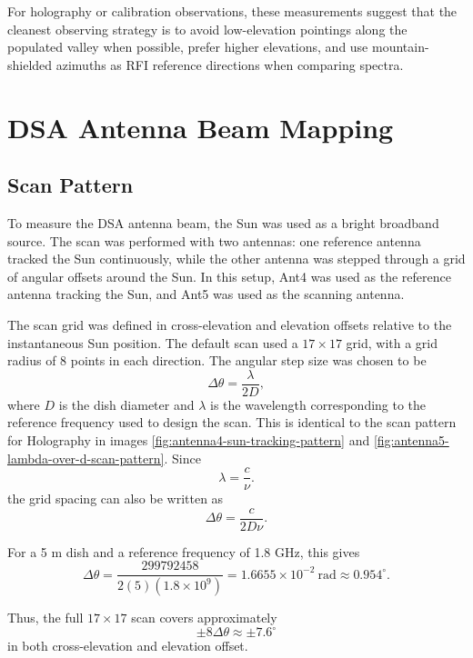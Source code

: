 \documentclass[12pt]{extarticle}
\begin{document}
For holography or calibration observations, these measurements suggest that the cleanest observing strategy is to avoid low-elevation pointings along the populated valley when possible, prefer higher elevations, and use mountain-shielded azimuths as RFI reference directions when comparing spectra.
\section{DSA Antenna Beam Mapping}

\subsection{Scan Pattern}

To measure the DSA antenna beam, the Sun was used as a bright broadband source.
The scan was performed with two antennas: one reference antenna tracked the Sun
continuously, while the other antenna was stepped through a grid of angular
offsets around the Sun. In this setup, Ant4 was used as the reference antenna
tracking the Sun, and Ant5 was used as the scanning antenna.

The scan grid was defined in cross-elevation and elevation offsets relative to
the instantaneous Sun position. The default scan used a \(17\times17\) grid, with
a grid radius of 8 points in each direction. The angular step size was chosen to
be
\begin{equation}
\Delta \theta
=
\frac{\lambda}{2D},
\end{equation}
where \(D\) is the dish diameter and \(\lambda\) is the wavelength corresponding
to the reference frequency used to design the scan. This is identical to the scan pattern for Holography in images \ref{fig:antenna4-sun-tracking-pattern} and \ref{fig:antenna5-lambda-over-d-scan-pattern}. Since
\begin{equation}
\lambda=\frac{c}{\nu}.
\label{eq:wavelength-frequency}
\end{equation}
the grid spacing can also be written as
\begin{equation}
\Delta \theta
=
\frac{c}{2D\nu}.
\end{equation}

For a 5 m dish and a reference frequency of 1.8 GHz, this gives
\begin{equation}
\Delta \theta
=
\frac{299792458}{2(5)(1.8\times10^9)}
=
1.6655\times10^{-2}~\mathrm{rad}
\approx
0.954^\circ .
\end{equation}

Thus, the full \(17\times17\) scan covers approximately
\[
\pm 8\Delta\theta \approx \pm 7.6^\circ
\]
in both cross-elevation and elevation offset.
\end{document}
